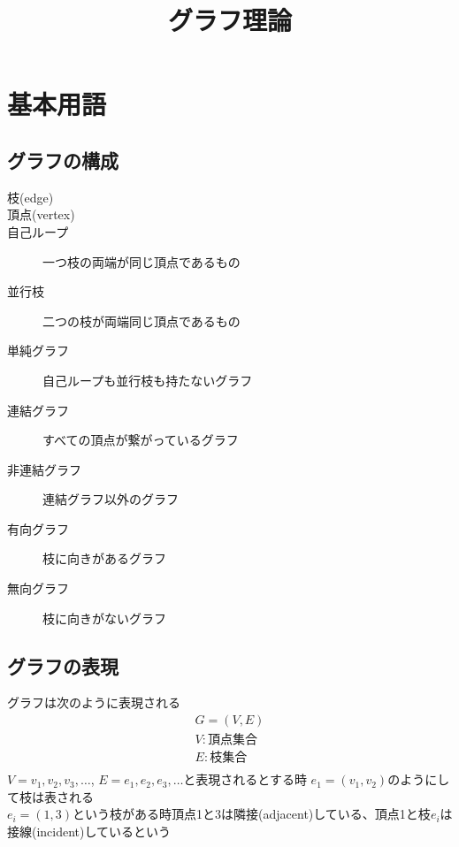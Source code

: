 \documentclass[a4j,10.5pt]{jarticle}
\title{グラフ理論}
\begin{document}
\maketitle

\section{基本用語}
\subsection{グラフの構成}
\begin{description}
\item [枝(edge)]
\item [頂点(vertex)]
\item [自己ループ] 一つ枝の両端が同じ頂点であるもの
\item [並行枝] 二つの枝が両端同じ頂点であるもの
\item [単純グラフ] 自己ループも並行枝も持たないグラフ
\end{description}

\begin{description}
\item[連結グラフ] すべての頂点が繋がっているグラフ
\item[非連結グラフ] 連結グラフ以外のグラフ
\end{description}

\begin{description}
\item[有向グラフ] 枝に向きがあるグラフ
\item[無向グラフ] 枝に向きがないグラフ
\end{description}

\subsection{グラフの表現}
グラフは次のように表現される
\begin{eqnarray*}
G=(V,E) \\
V:頂点集合 \\
E:枝集合 \\
\end{eqnarray*}
$V = {v_1,v_2,v_3,\dots}$,
$E = {e_1,e_2,e_3,\dots}$と表現されるとする時
$e_1 = (v_1,v_2)$のようにして枝は表される\\

$e_i = (1,3)$という枝がある時頂点1と3は隣接(adjacent)している、頂点1と枝$e_i$は接線(incident)しているという
\end{document}
